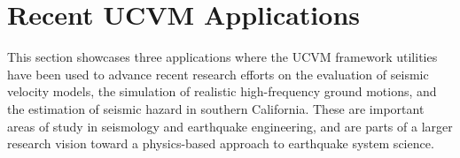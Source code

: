 
\section{Recent UCVM Applications}

This section showcases three applications where the UCVM framework utilities have been used to advance recent research efforts on the evaluation of seismic velocity models, the simulation of realistic high-frequency ground motions, and the estimation of seismic hazard in southern California. These are important areas of study in seismology and earthquake engineering, and are parts of a larger research vision toward a physics-based approach to earthquake system science.








